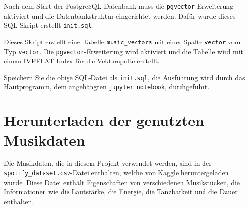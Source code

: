 Nach dem Start der PostgreSQL-Datenbank muss die \texttt{pgvector}-Erweiterung aktiviert und die Datenbankstruktur eingerichtet werden. Dafür wurde dieses SQL Skript erstellt \texttt{init.sql}:



Dieses Skript erstellt eine Tabelle \texttt{music\_vectors} mit einer Spalte \texttt{vector} vom Typ \texttt{vector}. Die \texttt{pgvector}-Erweiterung wird aktiviert und die Tabelle wird mit einem IVFFLAT-Index für die Vektorspalte erstellt. 

Speichern Sie die obige SQL-Datei als \texttt{init.sql}, die Ausführung wird durch das Hautprogramm, dem angehängten \texttt{jupyter notebook}, durchgeführt.

\section{Herunterladen der genutzten Musikdaten}

Die Musikdaten, die in diesem Projekt verwendet werden, sind in der \texttt{spotify\_dataset.csv}-Datei enthalten, welche von \href{https://www.kaggle.com/datasets/bricevergnou/spotify-recommendation}{Kaggle} heruntergeladen wurde. Diese Datei enthält Eigenschaften von verschiedenen Musikstücken, die Informationen wie die Lautstärke, die Energie, die Tanzbarkeit und die Dauer enthalten.